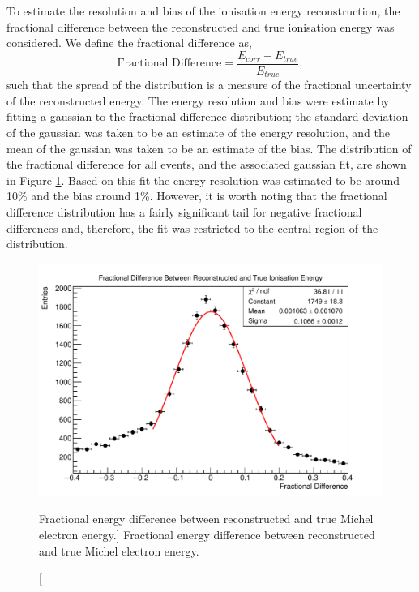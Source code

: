 To estimate the resolution and bias of the ionisation energy reconstruction, the
fractional difference between the reconstructed and true ionisation energy was
considered. We define the fractional difference as,
\begin{equation*}
	\mbox{Fractional Difference} = \frac{E_{corr} - E_{true}}{E_{true}},
\end{equation*}
such that the spread of the distribution is a measure of the fractional
uncertainty of the reconstructed energy. The energy resolution and bias were
estimate by fitting a gaussian to the fractional difference distribution; the
standard deviation of the gaussian was taken to be an estimate of the energy
resolution, and the mean of the gaussian was taken to be an estimate of the
bias. The distribution of the fractional difference for all events, and the 
associated gaussian fit, are shown in Figure \ref{fig:frac_diff_ion}. Based on
this fit the energy resolution was estimated to be around 10\% and the bias 
around 1\%. However, it is worth noting that the fractional difference
distribution has a fairly significant tail for negative fractional differences
and, therefore, the fit was restricted to the central region of the distribution.
\begin{figure}
	\centering
	\includegraphics[width=\textwidth]{figures/frac_diff_ion.pdf}
	\caption
	[Fractional energy difference between reconstructed and true Michel electron
	energy.]
	{Fractional energy difference between reconstructed and true Michel electron
	energy.}
	\label{fig:frac_diff_ion}
\end{figure}

